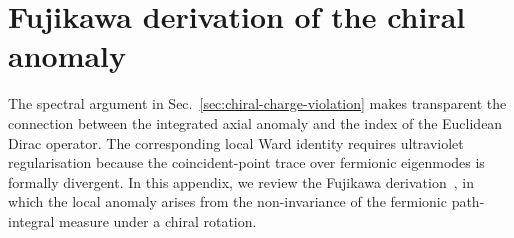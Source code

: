 \documentclass[review]{elsarticle}
\numberwithin{equation}{section}
\numberwithin{table}{section}
\numberwithin{figure}{section}
\begin{document}
\appendix
\renewcommand*{\thesection}{\Alph{section}}

\section{Fujikawa derivation of the chiral anomaly}
\label{app:Fujikawa-anomaly}

The spectral argument in Sec.~\ref{sec:chiral-charge-violation} makes transparent the connection between the integrated axial anomaly and the index of the Euclidean Dirac operator. The corresponding local Ward identity requires ultraviolet regularisation because the coincident-point trace over fermionic eigenmodes is formally divergent. In this appendix, we review the Fujikawa derivation~\cite{Fujikawa:1979ay,Fujikawa:1980eg}, in which the local anomaly arises from the non-invariance of the fermionic path-integral measure under a chiral rotation.
\end{document}
